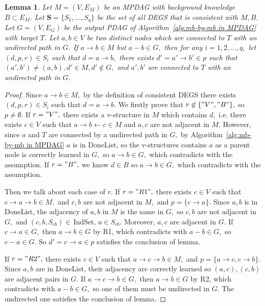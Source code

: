 \documentclass{article}
\newtheorem{lemma}{Lemma}
\begin{document}
\begin{lemma}
\label{lemma:complete induction}
Let $M=(V,E_M)$ be an MPDAG with background knowledge $B\subset E_M.$ Let $\mathbf{S}=\{S_1,\dots,S_q\}$ be the set of all DEGS that is consistent with $M,B.$ Let $G=(V,E_G)$ be the output PDAG of Algorithm~\ref{alg:mb-by-mb in MPDAG} with target $T$. Let $a,b\in V$ be two distinct nodes which are connected to $T$ with an undirected path in $G$. If $a\to b\in M$ but $a-b\in G,$ then for any $i=1,2,\dots,q,$ let $(d,p,r)\in S_i$ such that $d=a\to b,$ there exists $d'=a'\to b'\in p$ such that $(a',b')\neq (a,b), d'\in M,d'\not\in G,$ and $a',b'$ are connected to $T$ with an undirected path in $G.$
\end{lemma}
\begin{proof}
Since $a\to b\in M,$ by the definition of consistent DEGS there exists $(d,p,r)\in S_i$ such that $d=a\to b.$ We firstly prove that $r\not\in \{"V","B"\},$ so $p\neq \emptyset.$ If $r="V",$ there exists a v-structure in $M$ which contains $d,$ i.e. there exists $c\in V$ such that $a\to b\leftarrow c\in M$ and $a,c$ are not adjacent in $M.$ However, since $a$ and $T$ are connected by a undirected path in $G,$ by Algorithm~\ref{alg:mb-by-mb in MPDAG} $a$ is in DoneList, so the v-structures contains $a$ as a parent node is correctly learned in $G,$ so $a\to b\in G,$ which contradicts with the assumption. If $r="B",$ we know $d\in B$ so $a\to b\in G,$ which contradicts with the assumption.

Then we talk about each case of $r.$ If $r="R1",$ there exists $c\in V$ such that $c\to a\to b\in M,$ and $c,b$ are not adjacent in $M,$ and $p=\{c\to a\}.$ Since $a,b$ is in DoneList, the adjacency of $a,b$ in $M$ is the same in $G,$ so $c,b$ are not adjacent in $G,$ and $(c,b,S_{cb})\in\,$IndSet, $a\in S_{cb}.$ Moreover, $a,c$ are adjacent in $G.$ If $c\to a\in G,$ then $a\to b\in G$ by R1, which contradicts with $a-b\in G,$ so $c-a\in G.$ So $d'=c\to a\in p$ satisfies the conclusion of lemma.

If $r="R2",$ there exists $c\in V$ such that $a\to c\to b\in M,$ and $p=\{a\to c, c\to b\}.$ Since $a,b$ are in DoneList, their adjacency are correctly learned so $(a,c),(c,b)$ are adjacent pairs in $G.$ If $a\to c\to b\in G,$ then $a\to b\in G$ by R2, which contradicts with $a-b\in G,$ so one of them must be undirected in $G.$ The undirected one satisfies the conclusion of lemma.


\end{proof}
\end{document}
